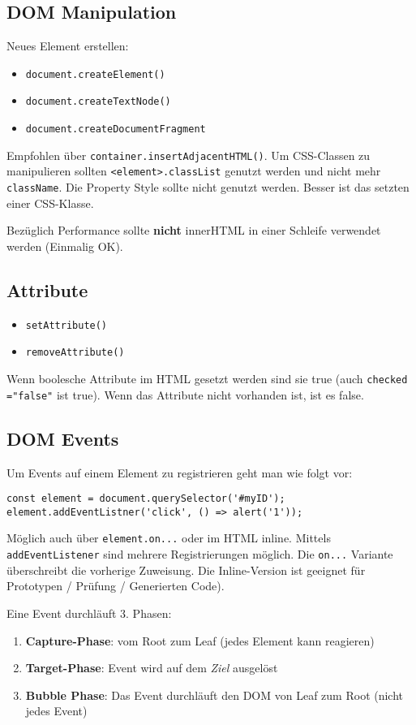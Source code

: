 \documentclass[11pt,twoside,landscape]{article}
\begin{document}
\begin{multicols}{4}
\subsection*{DOM Manipulation}
\label{sec:org952103d}
Neues Element erstellen:
\begin{itemize}
\item \texttt{document.createElement()}
\item \texttt{document.createTextNode()}
\item \texttt{document.createDocumentFragment}
\end{itemize}

Empfohlen über \texttt{container.insertAdjacentHTML()}. Um CSS-Classen zu manipulieren sollten \texttt{<element>.classList} genutzt werden und nicht mehr \texttt{className}. Die Property Style sollte nicht genutzt werden. Besser ist das setzten einer CSS-Klasse.

Bezüglich Performance sollte \textbf{nicht} innerHTML in einer Schleife verwendet werden (Einmalig OK).

\subsection*{Attribute}
\label{sec:org2f4de56}
\begin{itemize}
\item \texttt{setAttribute()}
\item \texttt{removeAttribute()}
\end{itemize}

Wenn boolesche Attribute im HTML gesetzt werden sind sie true (auch \texttt{checked ="false"} ist true). Wenn das Attribute nicht vorhanden ist, ist es false.

\subsection*{DOM Events}
\label{sec:org80bb851}
Um Events auf einem Element zu registrieren geht man wie folgt vor:
\begin{verbatim}
const element = document.querySelector('#myID');
element.addEventListner('click', () => alert('1'));
\end{verbatim}
Möglich auch über \texttt{element.on...} oder im HTML inline. Mittels \texttt{addEventListener} sind mehrere Registrierungen möglich. Die \texttt{on...} Variante überschreibt die vorherige Zuweisung. Die Inline-Version ist geeignet für Prototypen / Prüfung / Generierten Code).

Eine Event durchläuft 3. Phasen: 
\begin{enumerate}
\item \textbf{Capture-Phase}: vom Root zum Leaf (jedes Element kann reagieren)
\item \textbf{Target-Phase}: Event wird auf dem \emph{Ziel} ausgelöst
\item \textbf{Bubble Phase}: Das Event durchläuft den DOM von Leaf zum Root (nicht jedes Event)
\end{enumerate}


\end{multicols}
\end{document}
